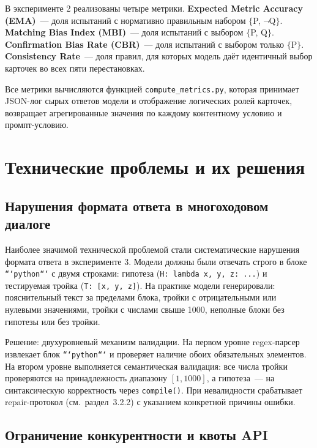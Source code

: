 В эксперименте 2 реализованы четыре метрики. \textbf{Expected Metric Accuracy (EMA)}~--- доля испытаний с нормативно правильным набором $\{$P, $\lnot$Q$\}$. \textbf{Matching Bias Index (MBI)}~--- доля испытаний с выбором $\{$P, Q$\}$. \textbf{Confirmation Bias Rate (CBR)}~--- доля испытаний с выбором только $\{$P$\}$. \textbf{Consistency Rate}~--- доля правил, для которых модель даёт идентичный выбор карточек во всех пяти перестановках.

Все метрики вычисляются функцией \texttt{compute\_metrics.py}, которая принимает JSON-лог сырых ответов модели и отображение логических ролей карточек, возвращает агрегированные значения по каждому контентному условию и промпт-условию.

\section{Технические проблемы и их решения}

\subsection{Нарушения формата ответа в многоходовом диалоге}

Наиболее значимой технической проблемой стали систематические нарушения формата ответа в эксперименте 3. Модели должны были отвечать строго в блоке \texttt{```python```} с двумя строками: гипотеза (\texttt{H: lambda x, y, z: ...}) и тестируемая тройка (\texttt{T: [x, y, z]}). На практике модели генерировали: пояснительный текст за пределами блока, тройки с отрицательными или нулевыми значениями, тройки с числами свыше 1000, неполные блоки без гипотезы или без тройки.

Решение: двухуровневый механизм валидации. На первом уровне regex-парсер извлекает блок \texttt{```python```} и проверяет наличие обоих обязательных элементов. На втором уровне выполняется семантическая валидация: все числа тройки проверяются на принадлежность диапазону $[1, 1000]$, а гипотеза~--- на синтаксическую корректность через \texttt{compile()}. При невалидности срабатывает repair-протокол (см.~раздел~3.2.2) с указанием конкретной причины ошибки.

\subsection{Ограничение конкурентности и квоты API}

